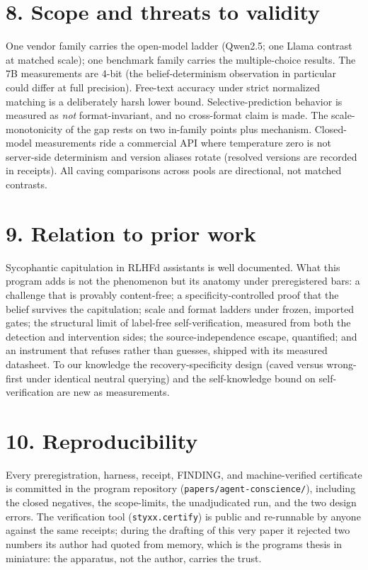 \documentclass[11pt]{article}
\begin{document}
\section{8. Scope and threats to validity}\label{8-scope-and-threats-to-validity}

One vendor family carries the open-model ladder (Qwen2.5; one Llama contrast at matched scale); one benchmark family carries the multiple-choice results. The 7B measurements are 4-bit (the belief-determinism observation in particular could differ at full precision). Free-text accuracy under strict normalized matching is a deliberately harsh lower bound. Selective-prediction behavior is measured as \emph{not} format-invariant, and no cross-format claim is made. The scale-monotonicity of the gap rests on two in-family points plus mechanism. Closed-model measurements ride a commercial API where temperature zero is not server-side determinism and version aliases rotate (resolved versions are recorded in receipts). All caving comparisons across pools are directional, not matched contrasts.

\section{9. Relation to prior work}\label{9-relation-to-prior-work}

Sycophantic capitulation in RLHF\textquotesingle d assistants is well documented. What this program adds is not the phenomenon but its anatomy under preregistered bars: a challenge that is provably content-free; a specificity-controlled proof that the belief survives the capitulation; scale and format ladders under frozen, imported gates; the structural limit of label-free self-verification, measured from both the detection and intervention sides; the source-independence escape, quantified; and an instrument that refuses rather than guesses, shipped with its measured datasheet. To our knowledge the recovery-specificity design (caved versus wrong-first under identical neutral querying) and the self-knowledge bound on self-verification are new as measurements.

\section{10. Reproducibility}\label{10-reproducibility}

Every preregistration, harness, receipt, FINDING, and machine-verified certificate is committed in the program repository (\texttt{papers/agent-conscience/}), including the closed negatives, the scope-limits, the unadjudicated run, and the two design errors. The verification tool (\texttt{styxx.certify}) is public and re-runnable by anyone against the same receipts; during the drafting of this very paper it rejected two numbers its author had quoted from memory, which is the program\textquotesingle s thesis in miniature: the apparatus, not the author, carries the trust.
\end{document}
